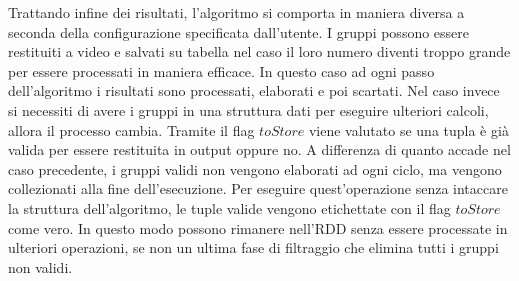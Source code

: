 Trattando infine dei risultati, l'algoritmo si comporta in maniera diversa a seconda della configurazione specificata dall'utente.
I gruppi possono essere restituiti a video e salvati su tabella nel caso il loro numero diventi troppo grande per essere processati in maniera efficace.
In questo caso ad ogni passo dell'algoritmo i risultati sono processati, elaborati e poi scartati.
Nel caso invece si necessiti di avere i gruppi in una struttura dati per eseguire ulteriori calcoli, allora il processo cambia.
Tramite il flag \(toStore\) viene valutato se una tupla è già valida per essere restituita in output oppure no.
A differenza di quanto accade nel caso precedente, i gruppi validi non vengono elaborati ad ogni ciclo, ma vengono collezionati alla fine dell'esecuzione.
Per eseguire quest'operazione senza intaccare la struttura dell'algoritmo, le tuple valide vengono etichettate con il flag \(toStore\) come vero.
In questo modo possono rimanere nell'RDD senza essere processate in ulteriori operazioni, se non un ultima fase di filtraggio che elimina tutti i gruppi non validi.